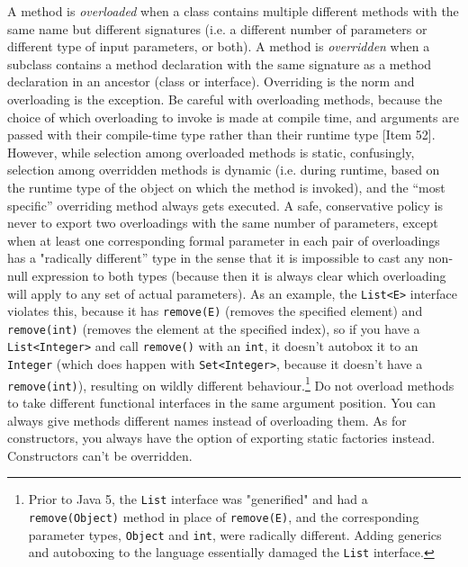\documentclass[8pt, table, xcdraw]{article}%
\begin{document}
A method is \emph{overloaded} when a class contains multiple different methods with the same name but different signatures (i.e. a different number of parameters or different type of input parameters, or both). A method is \emph{overridden} when a subclass contains a method declaration with the same signature as a method declaration in an ancestor (class or interface). Overriding is the norm and overloading is the exception. Be careful with overloading methods, because the choice of which overloading to invoke is made at compile time, and arguments are passed with their compile-time type rather than their runtime type [Item 52]. However, while selection among overloaded methods is static, confusingly, selection among overridden methods is dynamic (i.e. during runtime, based on the runtime type of the object on which the method is invoked), and the “most specific” overriding method always gets executed. A safe, conservative policy is never to export two overloadings with the same number of parameters, except when at least one corresponding formal parameter in each pair of overloadings has a "radically different” type in the sense that it is impossible to cast any non-null expression to both types (because then it is always clear which overloading will apply to any set of actual parameters). As an example, the \lstinline{List<E>} interface violates this, because it has \lstinline{remove(E)} (removes the specified element) and \lstinline{remove(int)} (removes the element at the specified index), so if you have a \lstinline{List<Integer>} and call \lstinline{remove()} with an \lstinline{int}, it doesn't autobox it to an \lstinline{Integer} (which does happen with \lstinline{Set<Integer>}, because it doesn't have a \lstinline{remove(int)}), resulting on wildly different behaviour.\footnote{Prior to Java 5, the \lstinline{List} interface was "generified" and had a \lstinline{remove(Object)} method in place of \lstinline{remove(E)}, and the corresponding parameter types, \lstinline{Object} and \lstinline{int}, were radically different. Adding generics and autoboxing to the language essentially damaged the \lstinline{List} interface.} Do not overload methods to take different functional interfaces in the same argument position. You can always give methods different names instead of overloading them. As for constructors, you always have the option of exporting static factories instead. Constructors can't be overridden.
\end{document}
